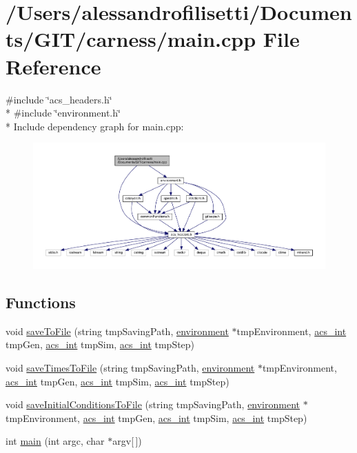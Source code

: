 \hypertarget{a00089}{\section{/\-Users/alessandrofilisetti/\-Documents/\-G\-I\-T/carness/main.cpp File Reference}
\label{a00089}
}
{\ttfamily \#include \char`\"{}acs\-\_\-headers.\-h\char`\"{}}\\*
{\ttfamily \#include \char`\"{}environment.\-h\char`\"{}}\\*
Include dependency graph for main.\-cpp\-:\nopagebreak
\begin{figure}[H]
\begin{center}
\leavevmode
\includegraphics[width=350pt]{a00138}
\end{center}
\end{figure}
\subsection*{Functions}
\begin{DoxyCompactItemize}
\item 
void \hyperlink{a00089_acac21f7e718db9d00451e3caaaacc25f}{save\-To\-File} (string tmp\-Saving\-Path, \hyperlink{a00014}{environment} $\ast$tmp\-Environment, \hyperlink{a00072_a8d277355641a098190360234e2ebde35}{acs\-\_\-int} tmp\-Gen, \hyperlink{a00072_a8d277355641a098190360234e2ebde35}{acs\-\_\-int} tmp\-Sim, \hyperlink{a00072_a8d277355641a098190360234e2ebde35}{acs\-\_\-int} tmp\-Step)
\item 
void \hyperlink{a00089_a2bf310904bc4e1fb5669e548525c4ba7}{save\-Times\-To\-File} (string tmp\-Saving\-Path, \hyperlink{a00014}{environment} $\ast$tmp\-Environment, \hyperlink{a00072_a8d277355641a098190360234e2ebde35}{acs\-\_\-int} tmp\-Gen, \hyperlink{a00072_a8d277355641a098190360234e2ebde35}{acs\-\_\-int} tmp\-Sim, \hyperlink{a00072_a8d277355641a098190360234e2ebde35}{acs\-\_\-int} tmp\-Step)
\item 
void \hyperlink{a00089_a4665c5f33b43dfc8fae4757552028cc0}{save\-Initial\-Conditions\-To\-File} (string tmp\-Saving\-Path, \hyperlink{a00014}{environment} $\ast$tmp\-Environment, \hyperlink{a00072_a8d277355641a098190360234e2ebde35}{acs\-\_\-int} tmp\-Gen, \hyperlink{a00072_a8d277355641a098190360234e2ebde35}{acs\-\_\-int} tmp\-Sim, \hyperlink{a00072_a8d277355641a098190360234e2ebde35}{acs\-\_\-int} tmp\-Step)
\item 
int \hyperlink{a00089_a0ddf1224851353fc92bfbff6f499fa97}{main} (int argc, char $\ast$argv\mbox{[}$\,$\mbox{]})
\end{DoxyCompactItemize}


